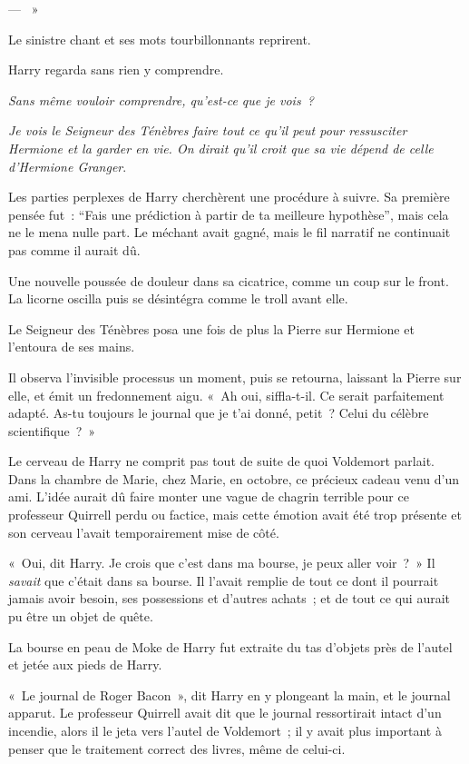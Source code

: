 --- ~»

Le sinistre chant et ses mots tourbillonnants reprirent.

Harry regarda sans rien y comprendre.

\emph{Sans même vouloir comprendre, qu'est-ce que je vois~?}

\emph{Je vois le Seigneur des Ténèbres faire tout ce qu'il peut pour ressusciter Hermione et la garder en vie. On dirait qu'il croit que sa vie dépend de celle d'Hermione Granger}.

Les parties perplexes de Harry cherchèrent une procédure à suivre. Sa première pensée fut~: “Fais une prédiction à partir de ta meilleure hypothèse”, mais cela ne le mena nulle part. Le méchant avait gagné, mais le fil narratif ne continuait pas comme il aurait dû.

Une nouvelle poussée de douleur dans sa cicatrice, comme un coup sur le front. La licorne oscilla puis se désintégra comme le troll avant elle.

Le Seigneur des Ténèbres posa une fois de plus la Pierre sur Hermione et l'entoura de ses mains.

Il observa l'invisible processus un moment, puis se retourna, laissant la Pierre sur elle, et émit un fredonnement aigu. «~Ah oui, siffla-t-il. Ce serait parfaitement adapté. As-tu toujours le journal que je t'ai donné, petit~? Celui du célèbre scientifique~?~»

Le cerveau de Harry ne comprit pas tout de suite de quoi Voldemort parlait. Dans la chambre de Marie, chez Marie, en octobre, ce précieux cadeau venu d'un ami. L'idée aurait dû faire monter une vague de chagrin terrible pour ce professeur Quirrell perdu ou factice, mais cette émotion avait été trop présente et son cerveau l'avait temporairement mise de côté.

«~Oui, dit Harry. Je crois que c'est dans ma bourse, je peux aller voir~?~» Il \emph{savait} que c'était dans sa bourse. Il l'avait remplie de tout ce dont il pourrait jamais avoir besoin, ses possessions et d'autres achats~; et de tout ce qui aurait pu être un objet de quête.

La bourse en peau de Moke de Harry fut extraite du tas d'objets près de l'autel et jetée aux pieds de Harry.

«~Le journal de Roger Bacon~», dit Harry en y plongeant la main, et le journal apparut. Le professeur Quirrell avait dit que le journal ressortirait intact d'un incendie, alors il le jeta vers l'autel de Voldemort~; il y avait plus important à penser que le traitement correct des livres, même de celui-ci.

